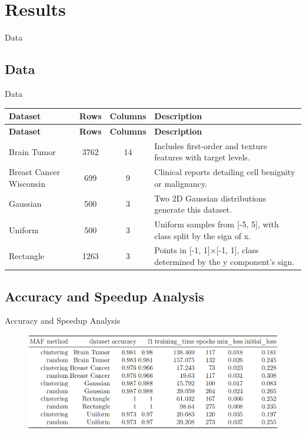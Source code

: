 \documentclass[aspectratio=169]{beamer}
\begin{document}
\section{Results}


\begin{frame}
    \begin{center}
        \Huge Data
    \end{center}
\end{frame}

\subsection{{Data}}
\begin{frame}{Data}
{\rm
\begin{longtable}{|>{\raggedright\arraybackslash}p{3cm}|c|c|>{\raggedright\arraybackslash}p{5cm}|}
\hline
\textbf{Dataset} & \textbf{Rows} & \textbf{Columns} & \textbf{Description} \\ \hline
\endfirsthead
\hline
\textbf{Dataset} & \textbf{Rows} & \textbf{Columns} & \textbf{Description} \\ \hline
\endhead
Brain Tumor & 3762 & 14 & Includes first-order and texture features with target levels. \\ \hline
Breast Cancer Wisconsin & 699 & 9 & Clinical reports detailing cell benignity or malignancy. \\ \hline
Gaussian & 500 & 3 & Two 2D Gaussian distributions generate this dataset. \\ \hline
Uniform & 500 & 3 & Uniform samples from [-5, 5], with class split by the sign of x. \\ \hline
Rectangle & 1263 & 3 & Points in [-1, 1]×[-1, 1], class determined by the y component's sign. \\ \hline
\end{longtable}
    }
\end{frame}

\subsection{Accuracy and Speedup Analysis}
\begin{frame}{Accuracy and Speedup Analysis}
\begin{figure}
    \centering
    \includegraphics[width=0.95\linewidth]{acc_speedup_table.png}
    \label{fig:enter-label}
\end{figure}
\end{frame}
\end{document}
